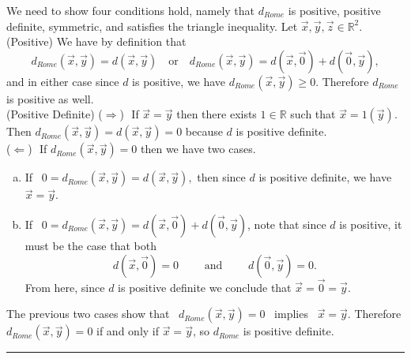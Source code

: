 \documentclass[12pt]{article}
\newcommand{\spand}{\qquad\text{ and }\qquad}
\newcommand{\forward}{\noindent ($\Longrightarrow$) \,\,}
\newcommand{\back}{\noindent ($\Longleftarrow$) \,\,}
\newcommand{\R}{\mathbb R} %
\newcommand{\dr}{d_{Rome}}
\newcommand{\x}{\vec{x}}
\newcommand{\y}{\vec{y}}
\newcommand{\z}{\vec{z}}
\newcommand{\vz}{\vec{0}}
\newenvironment{proof}{\noindent {\bf Proof: }}{\hfill
\rule{1mm}{3mm} \bigskip}
\begin{document}
  \begin{proof} We need to show four conditions hold, namely that $d_{Rome}$ is positive, positive definite, symmetric, and satisfies the triangle inequality. Let $\x,\y,\z \in \R^2.$\\

\noindent(Positive) We have by definition that $$\dr(\x,\y) = d(\x,\y) \quad\text{or}\quad \dr(\x,\y) = d(\x,\vec{0}) + d(\vec{0},\y),$$ and in either case since $d$ is positive, we have $\dr(\x,\y)\ge 0$. Therefore $\dr$ is positive as well.\\

\noindent(Positive Definite) \forward If $\x=\y$ then there exists $1\in\R$ such that $\x=1(\y)$. Then $\dr(\x,\y) = d(\x,\y)=0 $ because $d$ is positive definite.\\ 

\back If $\dr(\x,\y)=0$ then we have two cases.
\begin{enumerate}[(a)]
\item{If \ $0=\dr(\x,\y)=d(\x,\y),$ then since $d$ is positive definite, we have $\x=\y.$}
\item{If \  $0=\dr(\x,\y)=d(\x,\vec{0}) + d(\vz, \y)$, note that since $d$ is positive, it must be the case that both $$d(\x,\vz)=0\spand d(\vz,\y)=0.$$ From here, since $d$ is positive definite we conclude that $\x=\vz=\y.$}
\end{enumerate}

The previous two cases show that \ $\dr(\x,\y) = 0$ \  implies \ $\x=\y$. Therefore $\dr(\x,\y) = 0$ if and only if $\x=\y$, so $\dr$ is positive definite.\\



\end{proof}
\end{document}
